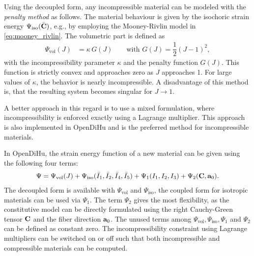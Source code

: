 Using the decoupled form, any incompressible material can be modeled with the \emph{penalty method} as follows. 
The material behaviour is given by the isochoric strain energy $\Psi_\text{iso}(\bar{\textbf{C}})$, e.g., by employing the Mooney-Rivlin model in \cref{eq:mooney_rivlin}. The volumetric part is defined as
\begin{align*}
  \Psi_\text{vol}(J) &= \kappa\,G(J) \qquad \text{with } G(J) = \dfrac12 (J-1)^2,
\end{align*}
with the incompressibility parameter $\kappa$ and the penalty function $G(J)$. This function is strictly convex and approaches zero as $J$ approaches 1. For large values of $\kappa$, the behavior is nearly incompressible. A disadvantage of this method is, that the resulting system becomes singular for $J \to 1$.

A better approach in this regard is to use a mixed formulation, where incompressibility is enforced exactly using a Lagrange multiplier. This approach is also implemented in OpenDiHu and is the preferred method for incompressible materials. 

In OpenDiHu, the strain energy function of a new material can be given using the following four terms:
%
\begin{align*}
  \Psi = \Psi_\text{vol}(J) + \Psi_\text{iso}(\bar{I}_1,\bar{I}_2,\bar{I}_4,\bar{I}_5) + \Psi_1(I_1,I_2,I_3) + \Psi_2(\textbf{C},\textbf{a}_0).
\end{align*}
The decoupled form is available with $\Psi_\text{vol}$ and $\Psi_\text{iso}$, the coupled form for isotropic materials can be used via $\Psi_1$. The term $\Psi_2$ gives the most flexibility, as the constitutive model can be directly formulated using the right Cauchy-Green tensor $\textbf{C}$ and the fiber direction $\textbf{a}_0$. The unused terms among $\Psi_\text{vol},\Psi_\text{iso},\Psi_1$ and $\Psi_2$ can be defined as constant zero. The incompressibility constraint using Lagrange multipliers can be switched on or off such that both incompressible and compressible materials can be computed.
%

